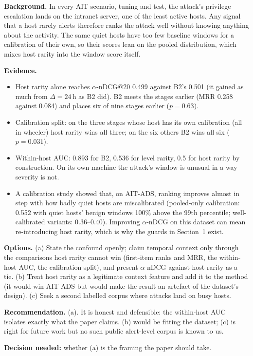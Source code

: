 \documentclass[10.5pt,a4paper]{article}
\newcommand{\rec}[1]{\par\smallskip\noindent\colorbox{gray!12}{\parbox{\dimexpr\linewidth-2\fboxsep}{\textbf{Recommendation.} #1}}\par\smallskip}
\newcommand{\ask}[1]{\par\noindent\textbf{Decision needed:} #1\par\medskip}
\newcommand{\sub}[1]{\par\smallskip\noindent\textbf{#1}\quad}
\begin{document}
\sub{Background.} In every AIT scenario, tuning and test, the attack's privilege escalation lands on the intranet server, one of the least active hosts. Any signal that a host rarely alerts therefore ranks the attack well without knowing anything about the activity. The same quiet hosts have too few baseline windows for a calibration of their own, so their scores lean on the pooled distribution, which mixes host rarity into the window score itself.

\sub{Evidence.}
\begin{itemize}
\item Host rarity alone reaches $\alpha$-nDCG@20 0.499 against B2's 0.501 (it gained as much from $\Delta = 24$\,h as B2 did). B2 meets the stages earlier (MRR 0.258 against 0.084) and places six of nine stages earlier ($p = 0.63$).
\item Calibration split: on the three stages whose host has its own calibration (all in wheeler) host rarity wins all three; on the six others B2 wins all six ($p = 0.031$).
\item Within-host AUC: 0.893 for B2, 0.536 for level rarity, 0.5 for host rarity by construction. On its own machine the attack's window is unusual in a way severity is not.
\item A calibration study showed that, on AIT-ADS, ranking improves almost in step with how badly quiet hosts are miscalibrated (pooled-only calibration: 0.552 with quiet hosts' benign windows 100\% above the 99th percentile; well-calibrated variants: 0.36--0.40). Improving $\alpha$-nDCG on this dataset can mean re-introducing host rarity, which is why the guards in Section~1 exist.
\end{itemize}

\sub{Options.} (a) State the confound openly; claim temporal context only through the comparisons host rarity cannot win (first-item ranks and MRR, the within-host AUC, the calibration split), and present $\alpha$-nDCG against host rarity as a tie. (b) Treat host rarity as a legitimate context feature and add it to the method (it would win AIT-ADS but would make the result an artefact of the dataset's design). (c) Seek a second labelled corpus where attacks land on busy hosts.

\rec{(a). It is honest and defensible: the within-host AUC isolates exactly what the paper claims. (b) would be fitting the dataset; (c) is right for future work but no such public alert-level corpus is known to us.}
\ask{whether (a) is the framing the paper should take.}
\end{document}
